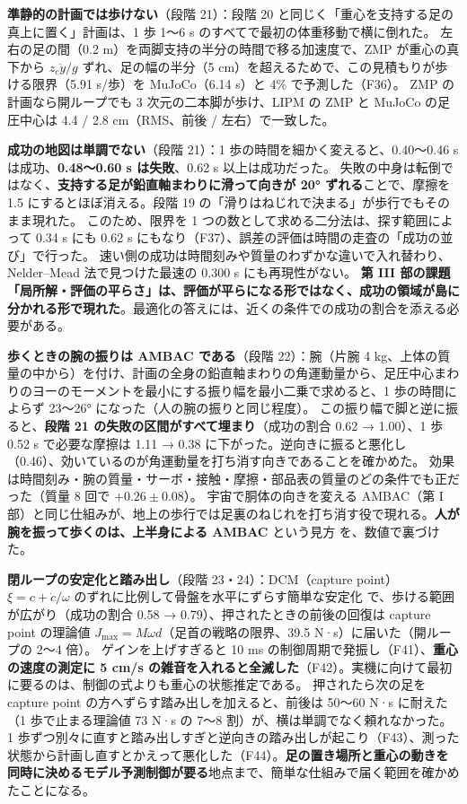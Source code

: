 \documentclass[paper=a4paper,fontsize=10pt,twocolumn,column_gap=2zw,line_length=24zw,number_of_lines=46,head_space=20mm]{jlreq}
\begin{document}
\textbf{準静的の計画では歩けない}（段階 21）：段階 20 と同じく「重心を支持する足の真上に置く」計画は、1 歩 1〜6 s のすべてで最初の体重移動で横に倒れた。
左右の足の間（0.2 m）を両脚支持の半分の時間で移る加速度で、ZMP が重心の真下から $z_c\ddot{y}/g$ ずれ、足の幅の半分（5 cm）を超えるためで、この見積もりが歩ける限界（5.91 s/歩）を MuJoCo（6.14 s）と 4\% で予測した（F36）。
ZMP の計画なら開ループでも 3 次元の二本脚が歩け、LIPM の ZMP と MuJoCo の足圧中心は 4.4 / 2.8 cm（RMS、前後 / 左右）で一致した。

\textbf{成功の地図は単調でない}（段階 21）：1 歩の時間を細かく変えると、0.40〜0.46 s は成功、\textbf{0.48〜0.60 s は失敗}、0.62 s 以上は成功だった。
失敗の中身は転倒ではなく、\textbf{支持する足が鉛直軸まわりに滑って向きが 20° ずれる}ことで、摩擦を 1.5 にするとほぼ消える。段階 19 の「滑りはねじれで決まる」が歩行でもそのまま現れた。
このため、限界を 1 つの数として求める二分法は、探す範囲によって 0.34 s にも 0.62 s にもなり（F37）、誤差の評価は時間の走査の「成功の並び」で行った。
速い側の成功は時間刻みや質量のわずかな違いで入れ替わり、Nelder--Mead 法で見つけた最速の 0.300 s にも再現性がない。
\textbf{第 III 部の課題「局所解・評価の平らさ」は、評価が平らになる形ではなく、成功の領域が島に分かれる形で現れた}。最適化の答えには、近くの条件での成功の割合を添える必要がある。

\textbf{歩くときの腕の振りは AMBAC である}（段階 22）：腕（片腕 4 kg、上体の質量の中から）を付け、計画の全身の鉛直軸まわりの角運動量から、足圧中心まわりのヨーのモーメントを最小にする振り幅を最小二乗で求めると、1 歩の時間によらず 23〜26° になった（人の腕の振りと同じ程度）。
この振り幅で脚と逆に振ると、\textbf{段階 21 の失敗の区間がすべて埋まり}（成功の割合 0.62 → 1.00）、1 歩 0.52 s で必要な摩擦は 1.11 → 0.38 に下がった。逆向きに振ると悪化し（0.46）、効いているのが角運動量を打ち消す向きであることを確かめた。
効果は時間刻み・腕の質量・サーボ・接触・摩擦・部品表の質量のどの条件でも正だった（質量 8 回で $+0.26\pm0.08$）。
宇宙で胴体の向きを変える AMBAC（第 I 部）と同じ仕組みが、地上の歩行では足裏のねじれを打ち消す役で現れる。\textbf{人が腕を振って歩くのは、上半身による AMBAC} という見方 \cite{collins2009} を、数値で裏づけた。

\textbf{閉ループの安定化と踏み出し}（段階 23・24）：DCM（capture point）$\xi = c + \dot c/\omega$ のずれに比例して骨盤を水平にずらす簡単な安定化 \cite{englsberger2015} で、歩ける範囲が広がり（成功の割合 0.58 → 0.79）、押されたときの前後の回復は capture point \cite{pratt2006} の理論値 $J_\mathrm{max}=M\omega d$（足首の戦略の限界、39.5 N·s）に届いた（開ループの 2〜4 倍）。
ゲインを上げすぎると 10 ms の制御周期で発振し（F41）、\textbf{重心の速度の測定に 5 cm/s の雑音を入れると全滅した}（F42）。実機に向けて最初に要るのは、制御の式よりも重心の状態推定である。
押されたら次の足を capture point の方へずらす踏み出しを加えると、前後は 50〜60 N·s に耐えた（1 歩で止まる理論値 73 N·s の 7〜8 割）が、横は単調でなく頼れなかった。
1 歩ずつ別々に直すと踏み出しすぎと逆向きの踏み出しが起こり（F43）、測った状態から計画し直すとかえって悪化した（F44）。\textbf{足の置き場所と重心の動きを同時に決めるモデル予測制御が要る}地点まで、簡単な仕組みで届く範囲を確かめたことになる。
\end{document}
